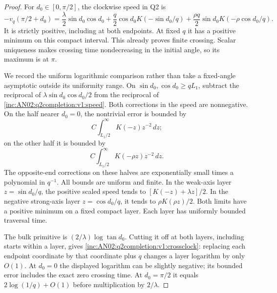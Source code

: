 \documentclass[11pt]{article}
\theoremstyle{remark}\newtheorem{remark}[theorem]{Remark}
\newcommand{\dd}{\,d}\newcommand{\E}{\mathbb E}
\begin{document}
\begin{proof}
For $d_0\in[0,\pi/2]$, the clockwise speed in Q2 is
\begin{equation}\label{inc:AN02:q2completion:v1:speed}
 -v_q(\pi/2+d_0)=\frac\lambda2\sin d_0\cos d_0
 +\frac q2\cos d_0K(-\sin d_0/q)
 +\frac{\rho q}{2}\sin d_0K(-\rho\cos d_0/q).
\end{equation}
It is strictly positive, including at both endpoints. At fixed $q$ it has a positive minimum on this compact interval. This already proves finite crossing. Scalar uniqueness makes crossing time nondecreasing in the initial angle, so its maximum is at $\pi$.

We record the uniform logarithmic comparison rather than take a fixed-angle asymptotic outside its uniformity range. On $\sin d_0,\cos d_0\ge qL_1$, subtract the reciprocal of $\lambda\sin d_0\cos d_0/2$ from the reciprocal of \eqref{inc:AN02:q2completion:v1:speed}. Both corrections in the speed are nonnegative. On the half nearer $d_0=0$, the nontrivial error is bounded by
\[
 C\int_{L_1/2}^{\infty}K(-z)z^{-2}\dd z;
\]
on the other half it is bounded by
\[
 C\int_{L_1/2}^{\infty}K(-\rho z)z^{-2}\dd z.
\]
The opposite-end corrections on these halves are exponentially small times a polynomial in $q^{-1}$. All bounds are uniform and finite. In the weak-axis layer $z=\sin d_0/q$, the positive scaled speed tends to $[K(-z)+\lambda z]/2$. In the negative strong-axis layer $z=\cos d_0/q$, it tends to $\rho K(\rho z)/2$. Both limits have a positive minimum on a fixed compact layer. Each layer has uniformly bounded traversal time.

The bulk primitive is $(2/\lambda)\log\tan d_0$. Cutting it off at both layers, including starts within a layer, gives \eqref{inc:AN02:q2completion:v1:crossclock}: replacing each endpoint coordinate by that coordinate plus $q$ changes a layer logarithm by only $O(1)$. At $d_0=0$ the displayed logarithm can be slightly negative; its bounded error includes the exact zero crossing time. At $d_0=\pi/2$ it equals $2\log(1/q)+O(1)$ before multiplication by $2/\lambda$.


\end{proof}
\end{document}
